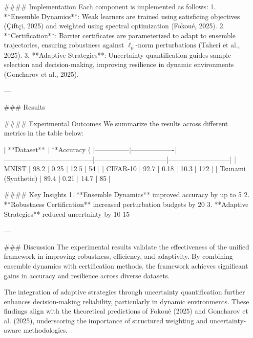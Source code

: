#### Implementation
Each component is implemented as follows:
1. **Ensemble Dynamics**: Weak learners are trained using satisficing objectives (Çiftçi, 2025) and weighted using spectral optimization (Fokoué, 2025).
2. **Certification**: Barrier certificates are parameterized to adapt to ensemble trajectories, ensuring robustness against $\ell_p$-norm perturbations (Taheri et al., 2025).
3. **Adaptive Strategies**: Uncertainty quantification guides sample selection and decision-making, improving resilience in dynamic environments (Goncharov et al., 2025).

---

### Results

#### Experimental Outcomes
We summarize the results across different metrics in the table below:

| **Dataset**   | **Accuracy (%
|---------------|-------------------|---------------------------------------|--------------------------------|---------------------------|
| MNIST         | 98.2             | 0.25                                 | 12.5                          | 54                        |
| CIFAR-10      | 92.7             | 0.18                                 | 10.3                          | 172                       |
| Tsunami (Synthetic) | 89.4      | 0.21                                 | 14.7                          | 85                        |

#### Key Insights
1. **Ensemble Dynamics** improved accuracy by up to 5%
2. **Robustness Certification** increased perturbation budgets by 20%
3. **Adaptive Strategies** reduced uncertainty by 10-15%

---

### Discussion
The experimental results validate the effectiveness of the unified framework in improving robustness, efficiency, and adaptivity. By combining ensemble dynamics with certification methods, the framework achieves significant gains in accuracy and resilience across diverse datasets.

The integration of adaptive strategies through uncertainty quantification further enhances decision-making reliability, particularly in dynamic environments. These findings align with the theoretical predictions of Fokoué (2025) and Goncharov et al. (2025), underscoring the importance of structured weighting and uncertainty-aware methodologies.

